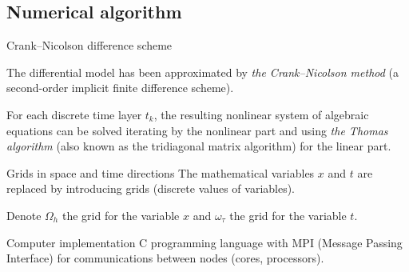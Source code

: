 \documentclass[hyperref={breaklinks=true},fleqn,mathserif]{beamer}
\begin{document}
\subsection{Numerical algorithm}

\begin{frame}[shrink=8]{Crank--Nicolson difference scheme}

\begin{exampleblock}{}
The differential model has been approximated by {\color{blue} \emph{the Crank--Nicolson method}} (a second-order implicit finite difference scheme).

\smallskip
For each discrete time layer $t_k$, the resulting nonlinear system of algebraic equations can be solved iterating by the nonlinear part
and using {\color{blue} \emph{the Thomas algorithm}} (also known as the tridiagonal matrix algorithm) for the linear part.
\end{exampleblock}

\pause
\begin{block}{Grids in space and time directions}
The mathematical variables $x$ and $t$ are replaced by introducing grids (discrete values of variables).

\smallskip
Denote $\Omega_h$ the grid for the variable $x$ and $\omega_{\tau}$ the grid for the variable $t$.
\end{block}

\pause
\begin{exampleblock}{Computer implementation}
C programming language with MPI (Message Passing Interface) for communications between nodes (cores, processors).
\end{exampleblock}

\end{frame}
\end{document}
